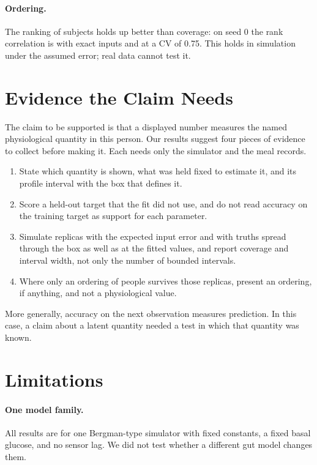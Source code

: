 \documentclass[letterpaper]{article} %
\begin{document}
\paragraph{Ordering.} The ranking of subjects holds up better than coverage: on seed 0 the rank correlation is \wsRandAZeroRho{} with exact inputs and \wsRandAThreeQuarterRho{} at a CV of 0.75. This holds in simulation under the assumed error; real data cannot test it.

\section{Evidence the Claim Needs}\label{sec:checks}

The claim to be supported is that a displayed number measures the named physiological quantity in this person. Our results suggest four pieces of evidence to collect before making it. Each needs only the simulator and the meal records.
\begin{enumerate}
\item State which quantity is shown, what was held fixed to estimate it, and its profile interval with the box that defines it.
\item Score a held-out target that the fit did not use, and do not read accuracy on the training target as support for each parameter.
\item Simulate replicas with the expected input error and with truths spread through the box as well as at the fitted values, and report coverage and interval width, not only the number of bounded intervals.
\item Where only an ordering of people survives those replicas, present an ordering, if anything, and not a physiological value.
\end{enumerate}
More generally, accuracy on the next observation measures prediction. In this case, a claim about a latent quantity needed a test in which that quantity was known.

\section{Limitations}

\paragraph{One model family.} All results are for one Bergman-type simulator with fixed constants, a fixed basal glucose, and no sensor lag. We did not test whether a different gut model changes them.
\end{document}
